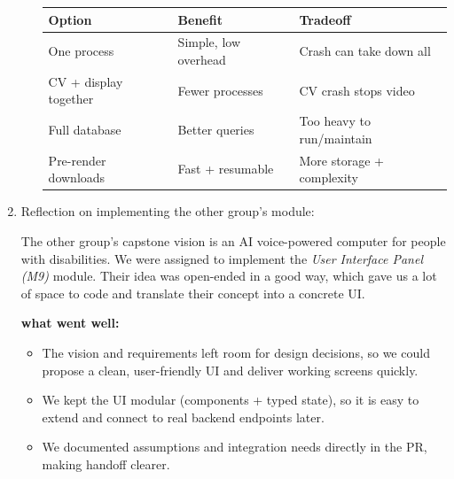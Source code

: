 \documentclass[12pt, titlepage]{article}
\begin{document}
\begin{enumerate}
\begin{itemize}
                \begin{table}[H]
                  \centering
                  \small
                  \setlength{\tabcolsep}{3pt}
                  \renewcommand{\arraystretch}{1.1}
                  \begin{tabular}{p{3.0cm} p{3.6cm} p{3.6cm}}
                    \toprule
                    \textbf{Option}       & \textbf{Benefit}     & \textbf{Tradeoff}         \\
                    \midrule
                    One process           & Simple, low overhead & Crash can take down all   \\
                    CV + display together & Fewer processes      & CV crash stops video      \\
                    Full database         & Better queries       & Too heavy to run/maintain \\
                    Pre-render downloads  & Fast + resumable     & More storage + complexity \\
                    \bottomrule
                  \end{tabular}
                \end{table}

        \end{itemize}

  \item Reflection on implementing the other group's module:

        The other group's capstone vision is an AI voice-powered computer for people
        with disabilities. We were assigned to implement the \textit{User Interface
          Panel (M9)} module. Their idea was open-ended in a good way, which gave us a
        lot of space to code and translate their concept into a concrete UI.

        \textbf{what went well:}
        \begin{itemize}
          \item The vision and requirements left room for design decisions, so we could propose
                a clean, user-friendly UI and deliver working screens quickly.
          \item We kept the UI modular (components + typed state), so it is easy to extend and
                connect to real backend endpoints later.
          \item We documented assumptions and integration needs directly in the PR, making
                handoff clearer.
        \end{itemize}


\end{enumerate}
\end{document}

